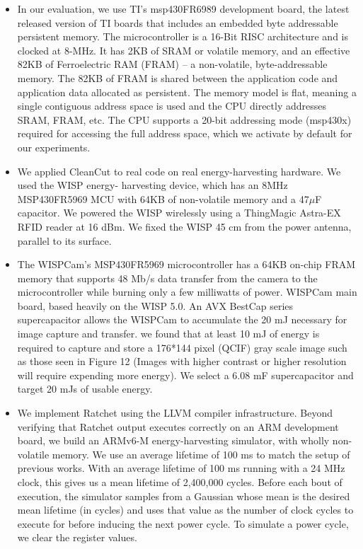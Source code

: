 \documentclass[]{article}
\begin{document}
\begin{itemize}
\item
  In our evaluation, we use TI's msp430FR6989 development board, the latest released version of TI boards that includes an embedded byte addressable persistent memory. The microcontroller is a 16-Bit RISC architecture and is clocked at 8-MHz. It has 2KB of SRAM or volatile memory, and an effective 82KB of Ferroelectric RAM (FRAM) -- a non-volatile, byte-addressable memory. The 82KB of FRAM is shared between the application code and application data allocated as persistent. The memory model is flat, meaning a single contiguous address space is used and the CPU directly addresses SRAM, FRAM, etc. The CPU supports a 20-bit addressing mode (msp430x) required for accessing the full address space, which we activate by default for our experiments.
\item
  We applied CleanCut to real code on real energy-harvesting hardware. We used the WISP energy- harvesting device, which has an 8MHz MSP430FR5969 MCU with 64KB of non-volatile memory and a 47\(\mu\)F capacitor. We powered the WISP wirelessly using a ThingMagic Astra-EX RFID reader at 16 dBm. We fixed the WISP 45 cm from the power antenna, parallel to its surface.
\item
  The WISPCam's MSP430FR5969 microcontroller has a 64KB on-chip FRAM memory that supports 48 Mb/s data transfer from the camera to the microcontroller while burning only a few milliwatts of power. WISPCam main board, based heavily on the WISP 5.0. An AVX BestCap series supercapacitor allows the WISPCam to accumulate the 20 mJ necessary for image capture and transfer. we found that at least 10 mJ of energy is required to capture and store a 176*144 pixel (QCIF) gray scale image such as those seen in Figure 12 (Images with higher contrast or higher resolution will require expending more energy). We select a 6.08 mF supercapacitor and target 20 mJs of usable energy.
\item
  We implement Ratchet using the LLVM compiler infrastructure. Beyond verifying that Ratchet output executes correctly on an ARM development board, we build an ARMv6-M energy-harvesting simulator, with wholly non-volatile memory. We use an average lifetime of 100 ms to match the setup of previous works. With an average lifetime of 100 ms running with a 24 MHz clock, this gives us a mean lifetime of 2,400,000 cycles. Before each bout of execution, the simulator samples from a Gaussian whose mean is the desired mean lifetime (in cycles) and uses that value as the number of clock cycles to execute for before inducing the next power cycle. To simulate a power cycle, we clear the register values.
\end{itemize}
\end{document}
